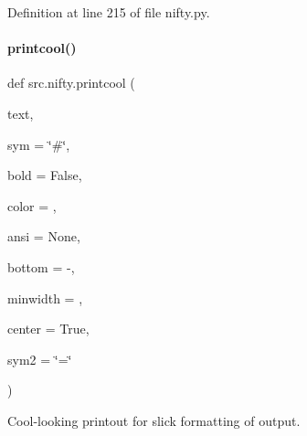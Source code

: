 Definition at line 215 of file nifty.\+py.

\mbox{\label{namespacesrc_1_1nifty_a9bda70a78d0f5d31e10dfffaf85803c9}} 
\paragraph{\texorpdfstring{printcool()}{printcool()}}
{\footnotesize\ttfamily def src.\+nifty.\+printcool (\begin{DoxyParamCaption}\item[{}]{text,  }\item[{}]{sym = {\ttfamily \char`\"{}\#\char`\"{}},  }\item[{}]{bold = {\ttfamily False},  }\item[{}]{color = {},  }\item[{}]{ansi = {\ttfamily None},  }\item[{}]{bottom = {\ttfamily \textquotesingle{}-\/\textquotesingle{}},  }\item[{}]{minwidth = {},  }\item[{}]{center = {\ttfamily True},  }\item[{}]{sym2 = {\ttfamily \char`\"{}=\char`\"{}} }\end{DoxyParamCaption})}



Cool-\/looking printout for slick formatting of output. 


